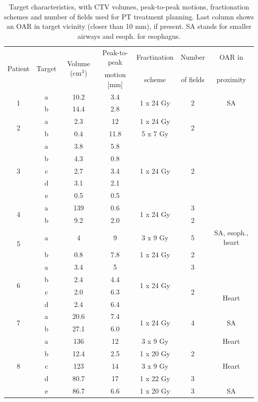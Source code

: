 \begin{table}[H]
	\centering
	\caption{Target characteristics, with CTV volumes, peak-to-peak motions, fractionation schemes and number of fields used for PT treatment planning. Last column 
	shows an OAR in target vicinity (closer than 10 mm), if present. SA stands for smaller airways and esoph. for esophagus.}
	\begin{tabular}{c|c|c|c|c|c|c}
		\hline\hline
		\multirow{2}{*}{Patient} & \multirow{2}{*}{Target} & \multirow{2}{*}{Volume (cm$^3$)} & Peak-to-peak & Fractination & Number & OAR in \\
		 & & & motion [mm] & scheme & of fields & proximity \\
		\hline
		\multirow{2}{*}{1} & a & 10.2 & 3.4  & \multirow{2}{*}{1 x 24 Gy} & \multirow{2}{*}{2} & \multirow{2}{*}{SA} \\
		 & b & 14.4 & 2.8 &  &  &  \\

		 \hline
		 \multirow{2}{*}{2} & a & 2.3 & 12  & 1 x 24 Gy & \multirow{2}{*}{2} \\
		 & b & 0.4 & 11.8  & 5 x 7 Gy &  \\
		 \hline
		 \multirow{5}{*}{3} & a & 3.8 & 5.8  & \multirow{5}{*}{1 x 24 Gy} & \multirow{5}{*}{2} \\
		  & b & 4.3 & 0.8  &  & \\
		  & c & 2.7 & 3.4  &  & \\
		  & d & 3.1 & 2.1  &  & \\
		  & e & 0.5 & 0.5  &  & \\
		  \hline
		  \multirow{2}{*}{4} & a & 139 & 0.6 & \multirow{2}{*}{1 x 24 Gy} & 3 \\
		 & b & 9.2 & 2.0  &  & 2 \\
		 \hline
		 \multirow{2}{*}{5} & a & 4 & 9  & 3 x 9 Gy  & 5 & SA, esoph., heart \\
		 & b & 0.8 & 7.8  & 1 x 24 Gy & 2 \\
		 \hline
		 \multirow{4}{*}{6} & a & 3.4   & 5    & \multirow{4}{*}{1 x 24 Gy} & 3  \\
				    & b & 2.4 & 4.4  & & \multirow{3}{*}{2} \\
				    & c & 2.0 & 6.3  & & & \multirow{2}{*}{Heart}\\
				    & d & 2.4 & 6.4  & & \\
		\hline	    
		\multirow{2}{*}{7} & a & 20.6 & 7.4 & \multirow{2}{*}{1 x 24 Gy} & \multirow{2}{*}{4} & \multirow{2}{*}{SA}  \\
		 & b & 27.1 & 6.0  &  &   \\
		 \hline
		 \multirow{5}{*}{8} & a & 136 & 12  & 3 x 9 Gy & \multirow{3}{*}{2} & Heart\\
		  & b & 12.4 & 2.5  & 1 x 20 Gy &  &\\
		  & c & 123 & 14  & 3 x 9 Gy &  &Heart \\
		 & d & 80.7 & 17  & 1 x 22 Gy & 3  &\\
		 & e & 86.7 & 6.6  & 1 x 20 Gy & 3 & SA \\
		\hline\hline
	\end{tabular}
	\label{tab:patdata2}
\end{table}


